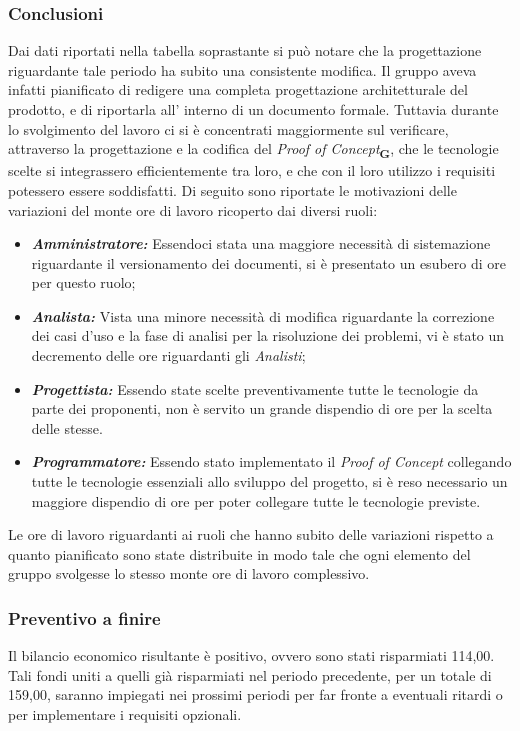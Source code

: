         \subsubsection{Conclusioni}
        Dai dati riportati nella tabella soprastante si può notare che la progettazione riguardante tale periodo ha subito una consistente modifica. Il gruppo aveva infatti pianificato di redigere una completa progettazione architetturale del prodotto, e di riportarla all’ interno di un documento formale. Tuttavia durante lo svolgimento del lavoro ci si è concentrati maggiormente sul verificare, attraverso la progettazione e la codifica del \textit{Proof of Concept}\textsubscript{\textbf{G}}, che le tecnologie scelte si integrassero efficientemente tra loro, e che con il loro utilizzo i requisiti potessero essere soddisfatti. Di seguito sono riportate le motivazioni delle variazioni del monte ore di lavoro ricoperto dai diversi ruoli:

            \begin{itemize}
                \item \textbf{\textit{Amministratore:}} Essendoci stata una maggiore necessità di sistemazione riguardante il versionamento dei documenti, si è presentato un esubero di ore per questo ruolo;
                \item \textbf{\textit{Analista:}} Vista una minore necessità di modifica riguardante la correzione dei casi d'uso e la fase di analisi per la risoluzione dei problemi, vi è stato un decremento delle ore riguardanti gli \textit{Analisti};
                \item \textbf{\textit{Progettista:}} Essendo state scelte preventivamente tutte le tecnologie da parte dei proponenti, non è servito un grande dispendio di ore per la scelta delle stesse.
                \item \textbf{\textit{Programmatore:}} Essendo stato implementato il \textit{Proof of Concept} collegando tutte le tecnologie essenziali allo sviluppo del progetto, si è reso necessario un maggiore dispendio di ore per poter collegare tutte le tecnologie previste.
            \end{itemize}

        Le ore di lavoro riguardanti ai ruoli che hanno subito delle variazioni rispetto a quanto pianificato sono state distribuite in modo tale che ogni elemento del gruppo svolgesse lo stesso monte ore di lavoro complessivo.

        \subsubsection{Preventivo a finire} Il bilancio economico risultante è positivo, ovvero sono stati risparmiati 114,00\EURdig. Tali fondi uniti a quelli già risparmiati nel periodo precedente, per un totale di 159,00\EurDig, saranno impiegati nei prossimi periodi per far fronte a eventuali ritardi o per implementare i requisiti opzionali.

